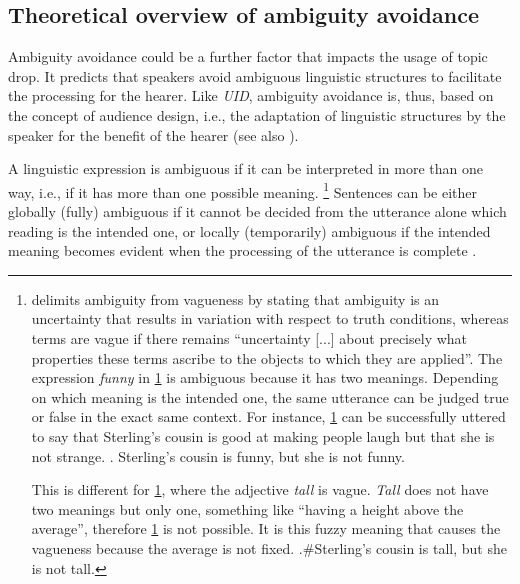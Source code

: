 \subsection{Theoretical overview of ambiguity avoidance }
\label{sec:usage.ambiguity.theory}
Ambiguity avoidance could be a further factor that impacts the usage of topic drop.
It predicts that speakers avoid ambiguous linguistic structures to facilitate the processing for the hearer.
Like \textit{UID}, ambiguity avoidance is, thus, based on the concept of audience design,  i.e., the adaptation of linguistic structures by the speaker for the benefit of the hearer (see also ).

A linguistic expression is ambiguous  if it can be interpreted in more than one way, i.e., if it has more than one possible meaning.%
\footnote{\citet[238--239]{kennedy2019} delimits ambiguity  from vagueness by stating that ambiguity is an uncertainty that results in variation with respect to truth conditions, whereas terms are vague if there remains ``uncertainty [...] about precisely what properties these terms ascribe to the objects to which they are applied''.
The expression \textit{funny} in \ref{ex:ambig} is ambiguous because it has two meanings.
Depending on which meaning is the intended one, the same utterance can be judged true or false in the exact same context.
For instance, \ref{ex:ambig} can be successfully uttered to say that Sterling's cousin is good at making people laugh but that she is not strange.
\ex.\label{ex:ambig} Sterling’s cousin is funny, but she is not funny. \citep[following][237]{kennedy2019}\par
This is different for \ref{ex:vague}, where the adjective \textit{tall} is vague. 
\textit{Tall} does not have two meanings but only one, something like ``having a height above the average'', therefore \ref{ex:vague} is not possible.
It is this fuzzy meaning that causes the vagueness because the average is not fixed.
\ex.\label{ex:vague}\#Sterling’s cousin is tall, but she is not tall.
\vspace{-0.75\baselineskip}
}
%
Sentences can be either globally (fully) ambiguous  if it cannot be decided from the utterance alone which reading is the intended one, or locally (temporarily) ambiguous if the intended meaning becomes evident when the processing of the utterance is complete \citep{pritchett1988, ferreira2007}.
